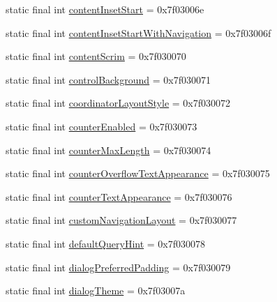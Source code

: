 \begin{DoxyCompactItemize}
static final int \mbox{\hyperlink{classandroid_1_1support_1_1design_1_1_r_1_1attr_a77f9dfd9dce9f6c88ca65515c38cdc14}{content\+Inset\+Start}} = 0x7f03006e
\item 
static final int \mbox{\hyperlink{classandroid_1_1support_1_1design_1_1_r_1_1attr_aba4cd177615fac68e644a4ed00251b4b}{content\+Inset\+Start\+With\+Navigation}} = 0x7f03006f
\item 
static final int \mbox{\hyperlink{classandroid_1_1support_1_1design_1_1_r_1_1attr_aa8a14d5b4064a43c901ed8f487694a90}{content\+Scrim}} = 0x7f030070
\item 
static final int \mbox{\hyperlink{classandroid_1_1support_1_1design_1_1_r_1_1attr_aa9c8ead3946ee0ead67bb68d1108f94a}{control\+Background}} = 0x7f030071
\item 
static final int \mbox{\hyperlink{classandroid_1_1support_1_1design_1_1_r_1_1attr_abfbb03499b88399b093a5049d36db8b8}{coordinator\+Layout\+Style}} = 0x7f030072
\item 
static final int \mbox{\hyperlink{classandroid_1_1support_1_1design_1_1_r_1_1attr_a4de2b94277e96c8145f1da466e15ee46}{counter\+Enabled}} = 0x7f030073
\item 
static final int \mbox{\hyperlink{classandroid_1_1support_1_1design_1_1_r_1_1attr_a0154de85ff5adabd99acceeec4668a7e}{counter\+Max\+Length}} = 0x7f030074
\item 
static final int \mbox{\hyperlink{classandroid_1_1support_1_1design_1_1_r_1_1attr_a9dd2184e532ad7d0a3d17e30eed3ce96}{counter\+Overflow\+Text\+Appearance}} = 0x7f030075
\item 
static final int \mbox{\hyperlink{classandroid_1_1support_1_1design_1_1_r_1_1attr_a9247391b6a23b8ee731419c16f5eaf4b}{counter\+Text\+Appearance}} = 0x7f030076
\item 
static final int \mbox{\hyperlink{classandroid_1_1support_1_1design_1_1_r_1_1attr_a547b2301cd4621ac6ea5496b9664a48a}{custom\+Navigation\+Layout}} = 0x7f030077
\item 
static final int \mbox{\hyperlink{classandroid_1_1support_1_1design_1_1_r_1_1attr_acaec52b5bbfc9784046add642d100758}{default\+Query\+Hint}} = 0x7f030078
\item 
static final int \mbox{\hyperlink{classandroid_1_1support_1_1design_1_1_r_1_1attr_a9fa2a0152120967429584cb510c55ef2}{dialog\+Preferred\+Padding}} = 0x7f030079
\item 
static final int \mbox{\hyperlink{classandroid_1_1support_1_1design_1_1_r_1_1attr_a591c5c254647c58b1ce1ab9dff81f91a}{dialog\+Theme}} = 0x7f03007a
\item 

\end{DoxyCompactItemize}
